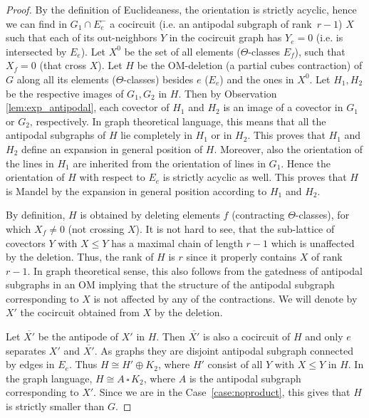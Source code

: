 \documentclass[final,11pt]{article}
\begin{document}
\begin{proof}
By the definition of Euclideaness, the orientation is strictly acyclic, hence we can find in $G_1\cap E_e^-$ a cocircuit (i.e. an antipodal subgraph of rank~$r-1$) $X$ such that each of its out-neighbors $Y$ in the cocircuit graph has $Y_e =0$  (i.e. is intersected by $E_e$). Let $X^0$ be the set of all elements ($\Theta$-classes $E_f$), such that $X_f=0$ (that cross $X$). Let $H$ be the OM-deletion (a partial cubes contraction) of $G$ along all its elements ($\Theta$-classes) besides $e$ ($E_e$) and the ones in $X^0$. Let $H_1, H_2$ be the respective images of $G_1, G_2$ in $H$. Then by Observation \ref{lem:exp_antipodal}, each covector of $H_1$ and $H_2$ is an image of a covector in $G_1$ or $G_2$, respectively. In graph theoretical language, this means that all the antipodal subgraphs of $H$ lie completely in $H_1$ or in $H_2$. This proves that $H_1$ and $H_2$ define an expansion in general position of $H$. Moreover, also the orientation of the lines in $H_1$ are inherited from the orientation of lines in $G_1$. Hence
the orientation of $H$ with respect to $E_e$ is strictly acyclic as well.  This proves that $H$ is Mandel by the expansion in general position according to $H_1$ and $H_2$.


By definition, $H$ is obtained by deleting elements $f$ (contracting $\Theta$-classes), for which  $X_f\neq 0$ (not crossing $X$). It is not hard to see, that the sub-lattice of covectors $Y$ with $X\leq Y$ has a maximal chain of length $r-1$ which is unaffected by the deletion. Thus, the rank of $H$ is $r$ since it properly contains $X$ of rank~$r-1$. In graph theoretical sense, this also follows from the gatedness of antipodal subgraphs in an OM implying that the structure of the antipodal subgraph corresponding to $X$ is not affected by any of the contractions. We will denote by $X'$ the cocircuit obtained from $X$ by the deletion.
%

Let $\overline{X'}$ be the antipode of $X'$ in $H$. Then $\overline{X'}$ is also a cocircuit of $H$ and only $e$ separates $X'$ and $\overline{X'}$. As graphs they are disjoint antipodal subgraph connected by edges in  $E_e$. Thus $H\cong H' \oplus K_2$, where $H'$ consist of all $Y$ with $X\leq Y$ in $H$. In the graph language, $H \cong A \, \square \, K_2$, where $A$ is the antipodal subgraph corresponding to $X'$. Since we are in the Case~\ref{case:noproduct}, this gives that $H$ is strictly smaller than $G$.


\end{proof}
\end{document}
